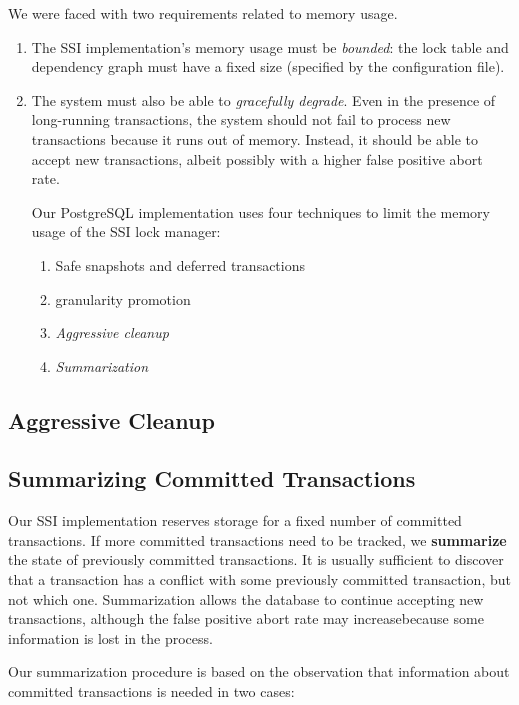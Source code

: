 \documentclass[11pt]{article}
\begin{document}
We were faced with two requirements related to memory usage.
\begin{enumerate}
\item The SSI implementation’s memory usage must be \emph{bounded}: the lock table and dependency graph must
have a fixed size (specified by the configuration file).
\item The system must also be able to \emph{gracefully degrade}. Even in the presence of long-running
transactions, the system should not fail to process new transactions because it runs out of memory.
Instead, it should be able to accept new transactions, albeit possibly with a higher false positive
abort rate.

Our PostgreSQL implementation uses four techniques to limit the memory usage of the SSI lock
manager:
\begin{enumerate}
\item Safe snapshots and deferred transactions
\item granularity promotion
\item \emph{Aggressive cleanup}
\item \emph{Summarization}
\end{enumerate}
\end{enumerate}
\subsection{Aggressive Cleanup}
\label{sec:orgb6bd89b}
\subsection{Summarizing Committed Transactions}
\label{sec:org9977aa5}
Our SSI implementation reserves storage for a fixed number of committed transactions. If more
committed transactions need to be tracked, we \textbf{summarize} the state of previously committed
transactions. It is usually sufficient to discover that a transaction has a conflict with some
previously committed transaction, but not which one. Summarization allows the database to continue
accepting new transactions, although the false positive abort rate may increasebecause some
information is lost in the process.

Our summarization procedure is based on the observation that information about committed transactions
is needed in two cases:
\end{document}
